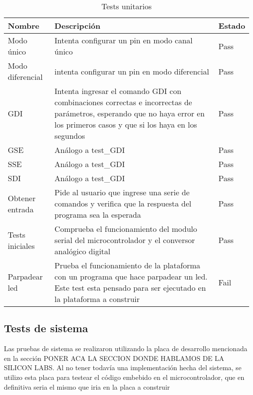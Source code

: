 \begin{table}[h]
\caption{Tests unitarios}
\label{it2:tab:tests_unitarios}
\begin{tabular}{p{2cm} p{7cm} p{2cm}}
\hline
\cellcolor[HTML]{68CBD0}Nombre & \cellcolor[HTML]{68CBD0}Descripción & \cellcolor[HTML]{68CBD0}Estado  \\ \hline
Modo único & Intenta configurar un pin en modo canal único & {\color[HTML]{009901} Pass}  \\ \hline
Modo diferencial & intenta configurar un pin en modo diferencial & {\color[HTML]{009901} Pass} \\ \hline
GDI & Intenta ingresar el comando GDI con combinaciones correctas e incorrectas de parámetros, esperando que no haya error en los primeros casos y que si los haya en los segundos & {\color[HTML]{009901} Pass} \\ \hline
GSE & Análogo a test\_GDI & {\color[HTML]{009901} Pass}  \\ \hline
SSE & Análogo a test\_GDI & {\color[HTML]{009901} Pass}  \\ \hline
SDI & Análogo a test\_GDI & {\color[HTML]{009901} Pass}  \\ \hline
Obtener entrada & Pide al usuario que ingrese una serie de comandos y verifica que la respuesta del programa sea la esperada & {\color[HTML]{009901} Pass}   \\ \hline
Tests iniciales & Comprueba el funcionamiento del modulo serial del microcontrolador y el conversor analógico digital & {\color[HTML]{009901} Pass}   \\ \hline
Parpadear led & Prueba el funcionamiento de la plataforma con un programa que hace parpadear un led. Este test esta pensado para ser ejecutado en la plataforma a construir & {\color[HTML]{CB0000} Fail}   \\
\end{tabular}
\end{table}


\subsection{Tests de sistema} %
\label{it2:sub:tests_de_sistema}

Las pruebas de sistema se realizaron utilizando la placa de desarrollo mencionada en la sección PONER ACA LA SECCION DONDE HABLAMOS DE LA SILICON LABS. Al no tener todavía una implementación hecha del sistema, se utilizo esta placa para testear el código embebido en el microcontrolador, que en definitiva seria el mismo que iria en la placa a construir

